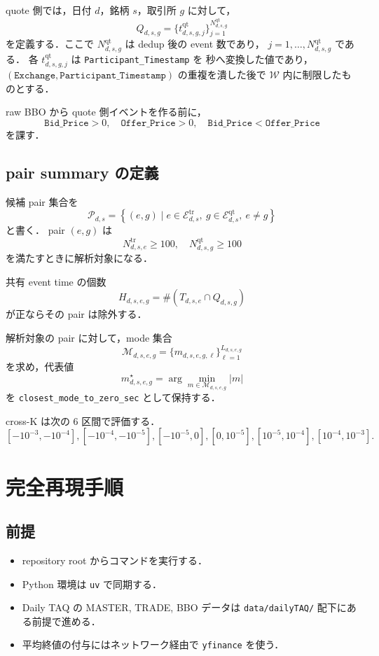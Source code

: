 \documentclass[a4paper,11pt]{jlreq}
\begin{document}
quote 側では，日付 \(d\)，銘柄 \(s\)，取引所 \(g\) に対して，
\[
  Q_{d,s,g} = \{t^{\mathrm{qt}}_{d,s,g,j}\}_{j=1}^{N^{\mathrm{qt}}_{d,s,g}}
\]
を定義する．ここで \(N^{\mathrm{qt}}_{d,s,g}\) は dedup 後の event 数であり，
\(j=1,\dots,N^{\mathrm{qt}}_{d,s,g}\) である．
各 \(t^{\mathrm{qt}}_{d,s,g,j}\) は \texttt{Participant\_Timestamp} を
秒へ変換した値であり，
\((\texttt{Exchange}, \texttt{Participant\_Timestamp})\) の重複を潰した後で
\(\mathcal{W}\) 内に制限したものとする．

raw BBO から quote 側イベントを作る前に，
\[
  \texttt{Bid\_Price} > 0,\quad
  \texttt{Offer\_Price} > 0,\quad
  \texttt{Bid\_Price} < \texttt{Offer\_Price}
\]
を課す．

\subsection{pair summary の定義}

候補 pair 集合を
\[
  \mathcal{P}_{d,s}
  =
  \left\{
    (e,g)
    \mid
    e \in \mathcal{E}^{\mathrm{tr}}_{d,s},
    \ g \in \mathcal{E}^{\mathrm{qt}}_{d,s},
    \ e \neq g
  \right\}
\]
と書く．
pair \((e,g)\) は
\[
  N^{\mathrm{tr}}_{d,s,e} \ge 100,\quad
  N^{\mathrm{qt}}_{d,s,g} \ge 100
\]
を満たすときに解析対象になる．

共有 event time の個数
\[
  H_{d,s,e,g}
  =
  \#\left(T_{d,s,e}\cap Q_{d,s,g}\right)
\]
が正ならその pair は除外する．

解析対象の pair に対して，mode 集合
\[
  \mathcal{M}_{d,s,e,g}
  =
  \{m_{d,s,e,g,\ell}\}_{\ell=1}^{L_{d,s,e,g}}
\]
を求め，代表値
\[
  m^{\star}_{d,s,e,g}
  =
  \arg\min_{m \in \mathcal{M}_{d,s,e,g}} |m|
\]
を \texttt{closest\_mode\_to\_zero\_sec} として保持する．

cross-K は次の 6 区間で評価する．
\[
  [-10^{-3},-10^{-4}],
  [-10^{-4},-10^{-5}],
  [-10^{-5},0],
  [0,10^{-5}],
  [10^{-5},10^{-4}],
  [10^{-4},10^{-3}].
\]

\section{完全再現手順}

\subsection{前提}

\begin{itemize}
  \item repository root からコマンドを実行する．
  \item Python 環境は \texttt{uv} で同期する．
  \item Daily TAQ の MASTER, TRADE, BBO データは
        \texttt{data/dailyTAQ/} 配下にある前提で進める．
  \item 平均終値の付与にはネットワーク経由で \texttt{yfinance} を使う．
\end{itemize}
\end{document}

